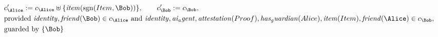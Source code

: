 \begin{align*}
&
c'_
{
\Alice
}
 := 
c_
{
\Alice
}
 \uplus 
\{
\mathit{
item
}
(
\mathrm{sgn}(
Item
,
\Bob
)
)
\}
, \qquad 
c'_
{
\Bob
}
 := 
c_
{
\Bob
}
,\\
&
\text{provided } 
\mathit{
identity
}
,
\mathit{
friend
}
(
\Bob
)
 \in c_
{
\Alice
}
 \text{ and } 
\mathit{
identity
}
,
\mathit{
ai_agent
}
,
\mathit{
attestation
}
(
Proof
)
,
\mathit{
has_guardian
}
(
Alice
)
,
\mathit{
item
}
(
Item
)
,
\mathit{
friend
}
(
\Alice
)
 \in c_
{
\Bob
}
,\\
&
\text{guarded by } \{
\Bob
\}
\end{align*}
